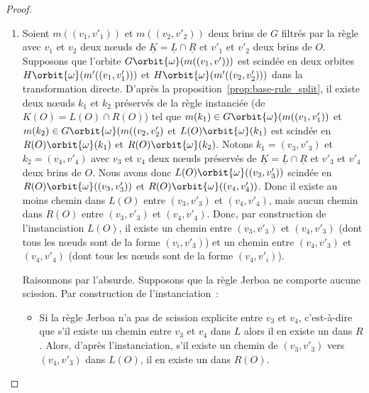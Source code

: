 \begin{proof}
\begin{enumerate}
\begin{itemize}
			      \item si au contraire $(v_1, v'_1)$ et $(v_2, v'_2)$ sont dans la même
			            $\orbit{\omega}$-orbites de $R(O)$ (car il existe un chemin $e_1 e_2 ... e_l$ de $O$
			            de source $v'_1$ et de cible $v'_2$ qui ne comprend pas l'étiquette $j$, ce
			            chemin est réécrit en un chemin $(w, e_1) (w,e_2) ... (w, e_l)$ de $R(O)$ dont
			            toutes les étiquettes sont dans $\orbit{\omega}$), d'après la proposition
			            \ref{prop:base-rule-modify}, alors $G\orbit{\omega}(m((v_1, v'_1))$ est modifiée par
			            la transformation directe $G \xlongrightarrow{r, \underline{m}} H$. %
		      \end{itemize}
		\item
		      Soient $m((v_1,v'_1))$ et $m((v_2,v'_2))$ deux brins de $G$ filtrés par la règle avec $v_1$ et $v_2$ deux n\oe uds de $\underline{K} = \underline{L} \cap \underline{R}$ et $v'_1$ et $v'_2$ deux brins de $O$. %
		      Supposons que l'orbite $G\orbit{\omega}(m((v_1,v')))$ est scindée en deux orbites $H\orbit{\omega}(m'((v_1, v'_1)))$ et $H\orbit{\omega}(m'((v_2, v'_2)))$ dans la transformation directe. %
		      D'après la proposition~\ref{prop:base-rule_split}, il existe deux n\oe uds $k_1$ et $k_2$ préservés de la règle instanciée (de $K(O) = L(O) \cap R(O)$) tel que $m(k_1) \in G\orbit{\omega}(m((v_1, v'_1))$ et $m(k_2) \in G\orbit{\omega}(m((v_2,v'_2)$ et $L(O)\orbit{\omega}(k_1)$ est scindée en $R(O)\orbit{\omega}(k_1)$ et $R(O)\orbit{\omega}(k_2)$. %
		      Notons $k_1 = (v_3, v'_3)$ et $k_2 = (v_4, v'_4)$ avec $v_3$ et $v_4$ deux n\oe uds préservés de $\underline{K} = \underline{L} \cap \underline{R}$ et $v'_3$ et $v'_4$ deux brins de $O$. %
		      Nous avons donc $L(O)\orbit{\omega}((v_3,v'_3))$ scindée en $R(O)\orbit{\omega}((v_3, v'_3))$ et $R(O)\orbit{\omega}((v_4, v'_4))$. %
		      Donc il existe au moins chemin dans $L(O)$ entre $(v_3, v'_3)$ et $(v_4, v'_4)$, mais aucun chemin dans $R(O)$ entre $(v_3, v'_3)$ et $(v_4, v'_4)$. %
		      Donc, par construction de l'instanciation $L(O)$, il existe un chemin entre $(v_3, v'_3)$ et $(v_4, v'_3)$ (dont tous les n\oe uds sont de la forme $(v_i, v'_3)$) et un chemin entre $(v_4, v'_3)$ et $(v_4, v'_4)$ (dont tous les n\oe uds sont de la forme $(v_4, v'_i)$). %

		      Raisonnons par l'absurde. %
		      Supposons que la règle Jerboa ne comporte aucune scission. %
		      Par construction de l'instanciation~:
		      \begin{itemize}
			      \item Si la règle Jerboa n'a pas de scission explicite entre $v_3$ et $v_4$, c'est-à-dire que s'il existe un chemin entre $v_3$ et $v_4$ dans $L$ alors il en existe un dans $R$. %
			            Alors, d'après l'instanciation, s'il existe un chemin de $(v_3, v'_3)$ vers $(v_4, v'_3)$ dans $L(O)$, il en existe un dans $R(O)$. %


\end{itemize}
\end{enumerate}
\end{proof}
